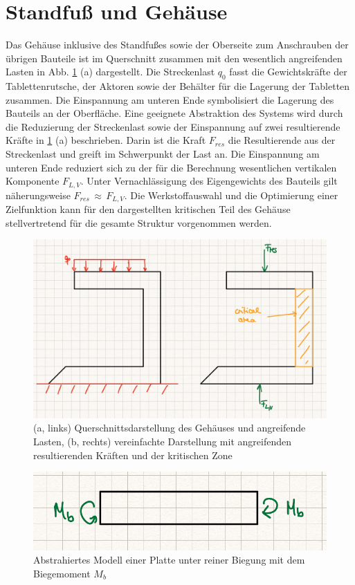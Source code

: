 \section{Standfuß und Gehäuse}\label{section:3.1}
Das Gehäuse inklusive des Standfußes sowie der Oberseite zum Anschrauben der übrigen Bauteile ist im Querschnitt zusammen mit den wesentlich angreifenden Lasten in Abb. \ref{fig:0301skizze} (a) dargestellt. Die Streckenlast $q_0$ fasst die Gewichtskräfte der Tablettenrutsche, der Aktoren sowie der Behälter für die Lagerung der Tabletten zusammen. Die Einspannung am unteren Ende symbolisiert die Lagerung des Bauteils an der Oberfläche. Eine geeignete Abstraktion des Systems wird durch die Reduzierung der Streckenlast sowie der Einspannung auf zwei resultierende Kräfte in \ref{fig:0301skizze} (a) beschrieben. Darin ist die Kraft $F_{res}$ die Resultierende aus der Streckenlast und greift im Schwerpunkt der Last an. Die Einspannung am unteren Ende reduziert sich zu der für die Berechnung wesentlichen vertikalen Komponente $F_{L,V}$. Unter Vernachlässigung des Eigengewichts des Bauteils gilt näherungsweise $F_{res}\,\approx\,F_{L,V}$. Die Werkstoffauswahl und die Optimierung einer Zielfunktion kann für den dargestellten kritischen Teil des Gehäuse stellvertretend für die gesamte Struktur vorgenommen werden.
\begin{figure}[H]
	\centering
	\includegraphics[width=1.0\linewidth]{chapter/Bilder/0301skizze}
	\caption{(a, links) Querschnittsdarstellung des Gehäuses und angreifende Lasten, (b, rechts) vereinfachte Darstellung mit angreifenden resultierenden Kräften und der kritischen Zone}
	\label{fig:0301skizze}
\end{figure}
\begin{figure}[H]
	\centering
	\includegraphics[width=1.0\linewidth]{chapter/Bilder/0301modell}
	\caption{Abstrahiertes Modell einer Platte unter reiner Biegung mit dem Biegemoment $M_b$}
	\label{fig:0301model}
\end{figure}
